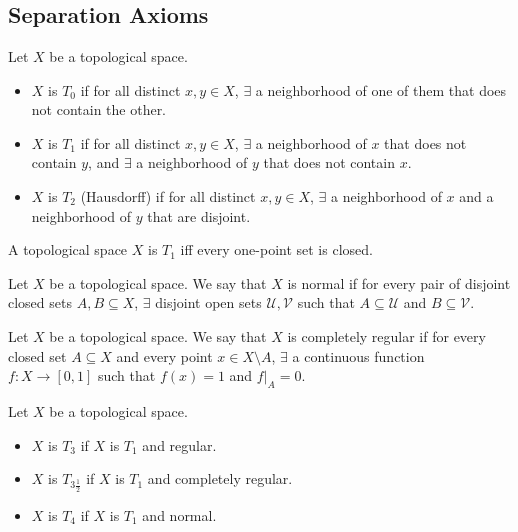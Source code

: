 \appendix

\chapter{}

\section{Separation Axioms}

\begin{df}
    Let $X$ be a topological space.
    \begin{itemize}
        \item $X$ is $T_0$ if for all distinct $x, y\in X$, $\exists$ a neighborhood of one of them that does not contain the other.
        \item $X$ is $T_1$ if for all distinct $x, y\in X$, $\exists$ a neighborhood of $x$ that does not contain $y$, and $\exists$ a neighborhood of $y$ that does not contain $x$.
        \item $X$ is $T_2$ (Hausdorff) if for all distinct $x, y\in X$, $\exists$ a neighborhood of $x$ and a neighborhood of $y$ that are disjoint.
    \end{itemize}
\end{df}

\begin{thm}
    A topological space $X$ is $T_1$ iff every one-point set is closed.
\end{thm}

\begin{df}
    Let $X$ be a topological space. We say that $X$ is normal if for every pair of disjoint closed sets $A, B\subseteq X$, $\exists$ disjoint open sets $\mathcal U, \mathcal V$ such that $A\subseteq \mathcal U$ and $B\subseteq \mathcal V$.
\end{df}

\begin{df}
    Let $X$ be a topological space. We say that $X$ is completely regular if for every closed set $A\subseteq X$ and every point $x\in X\setminus A$, $\exists$ a continuous function $f:X\to[0,1]$ such that $f(x)=1$ and $f|_A=0$.
\end{df}

\begin{df}
    Let $X$ be a topological space. 
    \begin{itemize}
        \item $X$ is $T_3$ if $X$ is $T_1$ and regular.
        \item $X$ is $T_{3\frac 1 2}$ if $X$ is $T_1$ and completely regular.
        \item $X$ is $T_4$ if $X$ is $T_1$ and normal.
    \end{itemize}
\end{df}

